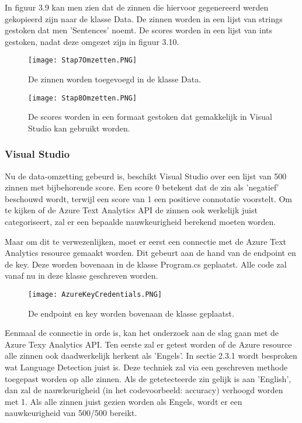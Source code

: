 In figuur 3.9 kan men zien dat de zinnen die hiervoor gegenereerd werden gekopieerd zijn naar de klasse Data. De zinnen worden in een lijst van strings gestoken dat men 'Sentences' noemt. De scores worden in een lijst van ints gestoken, nadat deze omgezet zijn in figuur 3.10.

\begin{figure}[!htbp]
    \texttt{[image: Stap7Omzetten.PNG]}
    \caption{\label{stap7amazon}De zinnen worden toegevoegd in de klasse Data.}
\end{figure}
\FloatBarrier

\begin{figure}[!htbp]
    \texttt{[image: Stap8Omzetten.PNG]}
    \caption{\label{stap8amazon}De scores worden in een formaat gestoken dat gemakkelijk in Visual Studio kan gebruikt worden.}
\end{figure}
\FloatBarrier


\subsubsection{Visual Studio}
\label{amazondatasetvisualstudioazure}
Nu de data-omzetting gebeurd is, beschikt Visual Studio over een lijst van 500 zinnen met bijbehorende score. Een score 0 betekent dat de zin als 'negatief' beschouwd wordt, terwijl een score van 1 een positieve connotatie voorstelt. Om te kijken of de Azure Text Analytics API de zinnen ook werkelijk juist categoriseert, zal er een bepaalde nauwkeurigheid berekend moeten worden. 

Maar om dit te verwezenlijken, moet er eerst een connectie met de Azure Text Analytics resource gemaakt worden. Dit gebeurt aan de hand van de endpoint en de key. Deze worden bovenaan in de klasse Program.cs geplaatst. Alle code zal vanaf nu in deze klasse geschreven worden. 

\begin{figure}[!htbp]
    \texttt{[image: AzureKeyCredentials.PNG]}
    \caption{\label{azurecredentials}De endpoint en key worden bovenaan de klasse geplaatst.}
\end{figure}
\FloatBarrier

Eenmaal de connectie in orde is, kan het onderzoek aan de slag gaan met de Azure Texy Analytics API. Ten eerste zal er getest worden of de Azure resource alle zinnen ook daadwerkelijk herkent als 'Engels'. In sectie 2.3.1 wordt besproken wat Language Detection juist is. Deze techniek zal via een geschreven methode toegepast worden op alle zinnen. Als de getetecteerde zin gelijk is aan 'English', dan zal de nauwkeurigheid (in het codevoorbeeld: accuracy) verhoogd worden met 1. Als alle zinnen juist gezien worden als Engels, wordt er een nauwkeurigheid van 500/500 bereikt. 

